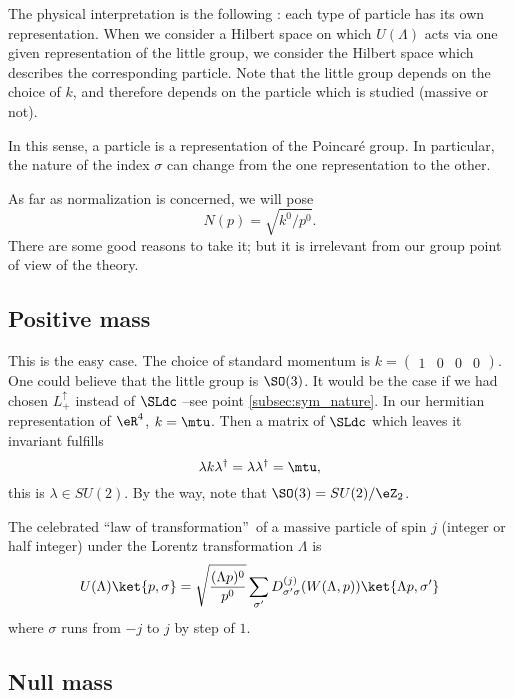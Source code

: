 The physical interpretation is the following\label{pg:phyz_reprez} : each type of particle has its own representation. When we consider a Hilbert space on which $U(\Lambda)$ acts via one given representation of the little group, we consider the Hilbert space which describes the corresponding particle. Note that the little group depends on the choice of $k$, and therefore depends on the particle which is studied (massive or not).

In this sense, a particle is a representation of the Poincaré group. In particular, the nature of the index $\sigma$ can change from the one representation to the other.

\begin{remark}
As far as normalization is concerned, we will pose
\[
  N(p)=\sqrt{k^0/p^0}.
\]
There are some good reasons to take it; but it is irrelevant from our group point of view of the theory.
\end{remark}

\subsection{Positive mass}

This is the easy case. The choice of standard momentum is $k=\begin{pmatrix}1&0&0&0\end{pmatrix}$. One could believe that the little group is $\SO(3)$. It would be the case if we had chosen $L_+^{\uparrow}$ instead of $\SLdc$ --see point \ref{subsec:sym_nature}. In our hermitian representation of $\eR^4$, $k=\mtu$. Then a matrix of $\SLdc$ which leaves it invariant fulfills
\[
   \lambda k\lambda^{\dag}=\lambda\lambda^{\dag}=\mtu,
\]
this is $\lambda\in SU(2)$. By the way, note that $\SO(3)=SU(2)/\eZ_2$.

The celebrated ``law of transformation''\ of a massive particle of spin $j$ (integer or half integer) under the Lorentz transformation $\Lambda$ is 
\begin{equation}
  U(\Lambda)\ket{p,\sigma}=\sqrt{\frac{ (\Lambda p)^0 }{p^0}}
       \sum_{\sigma'}D^{(j)}_{\sigma'\sigma}(W(\Lambda,p))\ket{\Lambda p,\sigma'}
\end{equation}
where $\sigma$ runs from $-j$ to $j$ by step of $1$.

\subsection{Null mass}

